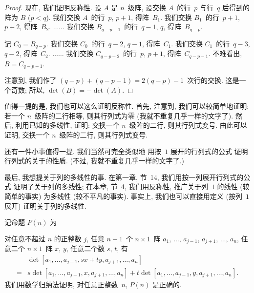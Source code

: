\documentclass[%
    UTF8,%
    fontset=none,%
    punct=kaiming,%
    zihao=-4,%
    a4paper,%
    oneside,%
]{ctexbook}
\makeatletter
\let\emph\relax
\renewenvironment{quotation}
{\list{}{\listparindent 2\ccwd%
\itemindent\listparindent
\leftmargin\rightmargin
\parsep\z@ \@plus\p@}%
\item\relax}
{\endlist}
\makeatother
\begin{document}
\begin{proof}
    现在, 我们证明反称性.
    设 \(A\) 是 \(n\)~级阵,
    设交换 \(A\)~的行~\(p\) 与行~\(q\) 后得到的阵为 \(B\)
    (\(p < q\)).
    我们交换 \(A\)~的行~\(p\), \(p+1\), 得阵~\(B_1\).
    我们交换 \(B_1\)~的行~\(p+1\), \(p+2\), 得阵~\(B_2\).
    \(\dots\dots\)
    我们交换 \(B_{q-p-1}\)~的行~\(q-1\), \(q\), 得阵~\(B_{q-p}\).

    记 \(C_0 = B_{q-p}\).
    我们交换 \(C_0\)~的行~\(q-2\), \(q-1\), 得阵~\(C_1\).
    我们交换 \(C_1\)~的行~\(q-3\), \(q-2\), 得阵~\(C_2\).
    \(\dots\dots\)
    我们交换 \(C_{q-p-2}\)~的行~\(p\), \(p+1\),
    得阵~\(C_{q-p-1}\).
    不难看出, \(B = C_{q-p-1}\).

    注意到, 我们作了
    \((q-p) + (q-p-1) = 2(q-p)-1\)~次行的交换.
    这是一个奇数;
    所以, \(\det {(B)} = -\det {(A)}\).
\end{proof}

值得一提的是, 我们也可以这么证明反称性.
首先, 注意到, 我们可以较简单地证明:
若一个 \(n\)~级阵的\emph{相邻的}二行相等,
则其行列式为零
(我就不重复几乎一样的文字了).
然后, 利用已知的多线性,
证明:
交换一个 \(n\)~级阵的\emph{相邻的}二行,
则其行列式变号.
由此可以证明, 交换一个 \(n\)~级阵的二行,
则其行列式变号.

还有一件小事值得一提.
我们当然可完全类似地%
用按\emph{行}~\(1\) 展开的行列式的公式%
证明行列式的关于\emph{列}的性质.
(不过, 我就不重复几乎一样的文字了.)

\vspace{2ex}

最后, 我想提关于列的多线性的事.
在第一章, 节~14, 我们用按一列展开行列式的公式%
证明了关于列的多线性;
在本章, 节~4, 我们用反称性,
推广关于列~\(1\) 的线性 (较简单的事实)
为多线性 (较不平凡的事实).
事实上, 我们也可以直接用定义 (按列~\(1\) 展开)
证明关于列的多线性.

记命题 \(P(n)\) 为
\begin{quotation}
    对任意不超过 \(n\) 的正整数 \(j\),
    任意 \(n-1\)~个 \(n \times 1\)~阵
    \(a_1\), \(\dots\), \(a_{j-1}\),
    \(a_{j+1}\), \(\dots\), \(a_n\),
    任意二个 \(n \times 1\)~阵 \(x\), \(y\),
    任意二个数 \(s\), \(t\),
    有
    \begin{align*}
             & \det
        {[a_1, \dots, a_{j-1}, sx + ty, a_{j+1}, \dots, a_n]}
        \\
        = {} &
        s
        \det {[a_1, \dots, a_{j-1}, x, a_{j+1}, \dots, a_n]}
        +
        t
        \det {[a_1, \dots, a_{j-1}, y, a_{j+1}, \dots, a_n]}.
    \end{align*}
\end{quotation}
我们用数学归纳法证明,
对任意正整数~\(n\),
\(P(n)\) 是正确的.
\end{document}
